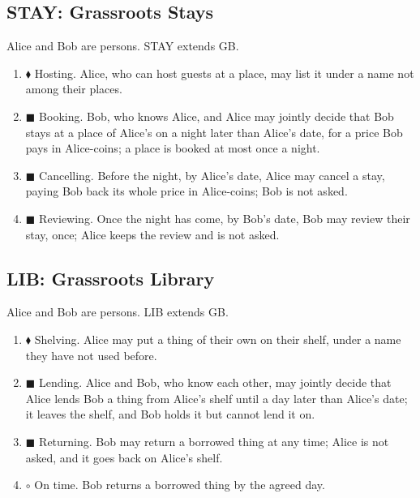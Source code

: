 \subsection*{STAY: Grassroots Stays}
\begin{contractbox}
Alice and Bob are persons.  STAY extends GB.\par\smallskip
\begin{enumerate}[leftmargin=*]
\item $\blacklozenge$ Hosting.  Alice, who can host guests at a place, may list it under a name not among their places.
\item $\blacksquare$ Booking.  Bob, who knows Alice, and Alice may jointly decide that Bob stays at a place of Alice's on a night later than Alice's date, for a price Bob pays in Alice-coins; a place is booked at most once a night.
\item $\blacksquare$ Cancelling.  Before the night, by Alice's date, Alice may cancel a stay, paying Bob back its whole price in Alice-coins; Bob is not asked.
\item $\blacksquare$ Reviewing.  Once the night has come, by Bob's date, Bob may review their stay, once; Alice keeps the review and is not asked.
\end{enumerate}
\end{contractbox}

\subsection*{LIB: Grassroots Library}
\begin{contractbox}
Alice and Bob are persons.  LIB extends GB.\par\smallskip
\begin{enumerate}[leftmargin=*]
\item $\blacklozenge$ Shelving.  Alice may put a thing of their own on their shelf, under a name they have not used before.
\item $\blacksquare$ Lending.  Alice and Bob, who know each other, may jointly decide that Alice lends Bob a thing from Alice's shelf until a day later than Alice's date; it leaves the shelf, and Bob holds it but cannot lend it on.
\item $\blacksquare$ Returning.  Bob may return a borrowed thing at any time; Alice is not asked, and it goes back on Alice's shelf.
\item $\circ$ On time.  Bob returns a borrowed thing by the agreed day.
\end{enumerate}
\end{contractbox}

